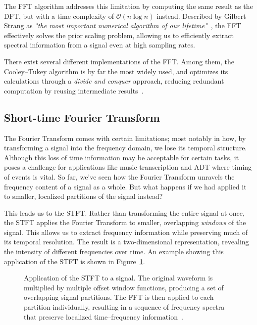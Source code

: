 The \gls{FFT} algorithm addresses this limitation by computing the same result as the \gls{DFT}, but with a time complexity of $\mathcal{O}(n\log{n})$ instead. Described by Gilbert Strang as \textit{"the most important numerical algorithm of our lifetime"}~\cite{strang1993wavelet}, the \gls{FFT} effectively solves the prior scaling problem, allowing us to efficiently extract spectral information from a signal even at high sampling rates.

There exist several different implementations of the \gls{FFT}. Among them, the Cooley–Tukey algorithm is by far the most widely used, and optimizes its calculations through a \textit{divide and conquer} approach, reducing redundant computation by reusing intermediate results~\cite{d3ea2d52-5ab2-3128-8b80-efb85267295d}.

\subsection{Short-time Fourier Transform}

The Fourier Transform comes with certain limitations; most notably in how, by transforming a signal into the frequency domain, we lose its temporal structure. Although this loss of time information may be acceptable for certain tasks, it poses a challenge for applications like music transcription and \gls{ADT} where timing of events is vital. So far, we've seen how the Fourier Transform unravels the frequency content of a signal as a whole. But what happens if we had applied it to smaller, localized partitions of the signal instead?

This leads us to the \gls{STFT}. Rather than transforming the entire signal at once, the \gls{STFT} applies the Fourier Transform to smaller, overlapping \textit{windows} of the signal. This allows us to extract frequency information while preserving much of its temporal resolution. The result is a two-dimensional representation, revealing the intensity of different frequencies over time. An example showing this application of the \gls{STFT} is shown in Figure~\ref{STFTFigure}.

\begin{figure}[H]
    \centering
    
    \caption{Application of the \gls{STFT} to a signal. The original waveform is multiplied by multiple offset window functions, producing a set of overlapping signal partitions. The \gls{FFT} is then applied to each partition individually, resulting in a sequence of frequency spectra that preserve localized time–frequency information~\cite{jeon2020area}.}
    \label{STFTFigure}
\end{figure}

